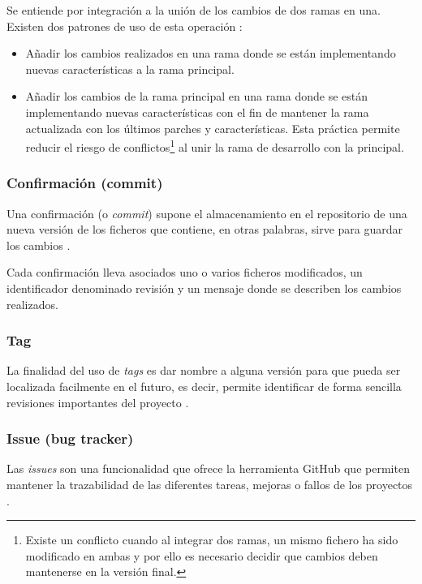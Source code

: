 Se entiende por integración a la unión de los cambios de dos ramas en una. Existen dos patrones de uso de esta operación \cite{sbf5:git3}:

\begin{itemize}
	\item Añadir los cambios realizados en una rama donde se están implementando nuevas características a la rama principal.
	\item Añadir los cambios de la rama principal en una rama donde se están implementando nuevas características con el fin de mantener la rama actualizada con los últimos parches y características. Esta práctica permite reducir el riesgo de conflictos\footnote{Existe un conflicto cuando al integrar dos ramas, un mismo fichero ha sido modificado en ambas y por ello es necesario decidir que cambios deben mantenerse en la versión final.} al unir la rama de desarrollo con la principal.
\end{itemize}


\subsubsection{Confirmación (commit)}

Una confirmación (o \textit{commit}) supone el almacenamiento en el repositorio de una nueva versión de los ficheros que contiene, en otras palabras, sirve para guardar los cambios \cite{Chacon:2014:PG:2695634}.

Cada confirmación lleva asociados uno o varios ficheros modificados, un identificador denominado revisión y un mensaje donde se describen los cambios realizados.

\subsubsection{Tag}

La finalidad del uso de \textit{tags} es dar nombre a alguna versión para que pueda ser localizada facilmente en el futuro, es decir, permite identificar de forma sencilla revisiones importantes del proyecto \cite{wiki:002}.

\subsubsection{Issue (bug tracker)}

Las \textit{issues} son una funcionalidad que ofrece la herramienta GitHub que permiten mantener la trazabilidad de las diferentes tareas, mejoras o fallos de los proyectos \cite{github:issues}.


